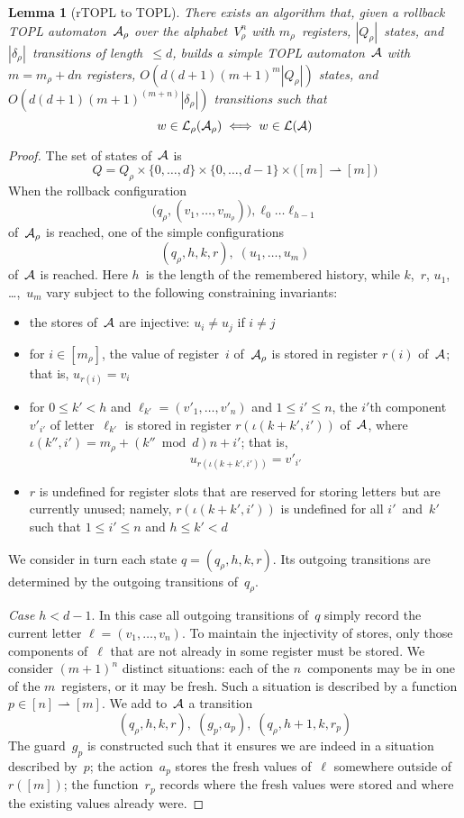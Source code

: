 \documentclass{article} %
\newcommand{\pmap}{\rightharpoonup}
\newtheorem{lemma}{Lemma}
\theoremstyle{definition}
\theoremstyle{remark}
\begin{document}
\begin{lemma}[rTOPL to TOPL]\label{lemma:rtopl-to-topl}
There exists an algorithm that, given a rollback TOPL automaton~${\cal A}_\rho$ over the alphabet~$V_\rho^n$ with $m_\rho$~registers, $|Q_\rho|$~states, and $|\delta_\rho|$~transitions of length~$\le d$, builds a simple TOPL automaton~${\cal A}$ with $m=m_\rho+dn$ registers, $O(d(d+1) (m+1)^m|Q_\rho|)$ states, and $O(d(d+1) (m+1)^{(m+n)}|\delta_\rho|)$ transitions such that
\[ w\in{\cal L}_\rho({\cal A}_\rho) \iff w
\in{\cal L}({\cal A})\]
\end{lemma}
\begin{proof}
The set of states of~${\cal A}$ is \[Q=Q_\rho\times\{0,\ldots,d\}\times\{0,\ldots,d-1\}\times\bigl([m]\pmap[m]\bigr)\]
When the rollback configuration
\[ \bigl(q_\rho,(v_1,\ldots,v_{m_\rho})\bigr),\ell_0\ldots\ell_{h-1}\]
of~${\cal A}_\rho$ is reached, one of the simple configurations
\[ (q_\rho,h,k,r),\;(u_1,\ldots,u_m) \]
of~${\cal A}$ is reached.
Here $h$~is the length of the remembered history, while $k$,~$r$, $u_1$, \dots,~$u_m$ vary subject to the following constraining invariants:
\begin{itemize}
\item the stores of~${\cal A}$ are injective: $u_i \ne u_j$ if $i\ne j$
\item for $i\in[m_\rho]$, the value of register~$i$ of~${\cal A}_\rho$ is stored in register $r(i)$ of~${\cal A}$; that is, $ u_{r(i)} = v_i $
\item for $0\le k'<h$ and $\ell_{k'}=(v'_1,\ldots,v'_n)$ and $1\le i'\le n$, the $i'$th component~$v'_{i'}$ of letter~$\ell_{k'}$ is stored in register $r(\iota(k+k',i'))$ of~${\cal A}$, where $\iota(k'',i')=m_\rho+(k''\bmod d)n+i'$; that is,
  \[u_{r(\iota(k+k',i'))}=v'_{i'}\]
\item $r$ is undefined for register slots that are reserved for storing letters but are currently unused; namely, $r(\iota(k+k',i'))$ is undefined for all $i'$~and~$k'$ such that $1\le i'\le n$ and $h\le k'<d$
\end{itemize}

\smallskip
We consider in turn each state $q=(q_\rho,h,k,r)$.
Its outgoing transitions are determined by the outgoing transitions of~$q_\rho$.

{\it Case $h<d-1$}.
In this case all outgoing transitions of~$q$ simply record the current letter $\ell=(v_1,\ldots,v_n)$.
To maintain the injectivity of stores, only those components of~$\ell$ that are not already in some register must be stored.
We consider $(m+1)^n$ distinct situations: each of the $n$~components may be in one of the $m$~registers, or it may be fresh.
Such a situation is described by a function $p\in[n]\pmap[m]$.
We add to~${\cal A}$ a transition
\[ (q_\rho,h,k,r),\;(g_p,a_p),\;(q_\rho,h+1,k,r_p)\]
The guard~$g_p$ is constructed such that it ensures we are indeed in a situation described by~$p$; the action~$a_p$ stores the fresh values of~$\ell$ somewhere outside of $r([m])$; the function~$r_p$ records where the fresh values were stored and where the existing values already were.


\end{proof}
\end{document}
